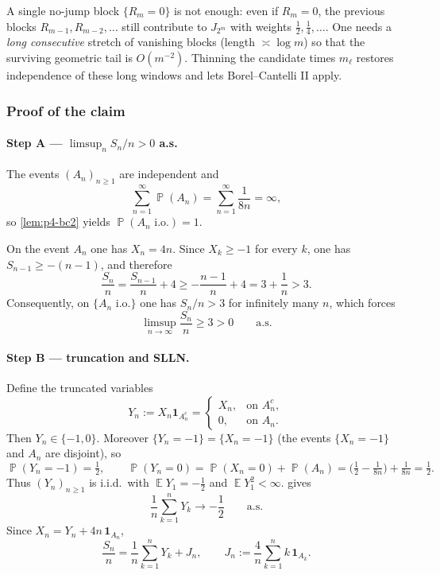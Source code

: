 \documentclass[11pt,a4paper]{article}
\DeclareMathOperator{\E}{\mathbb{E}}
\DeclareMathOperator{\Pbb}{\mathbb{P}}
\begin{document}
\begin{remark*}
A single no-jump block \(\{R_m=0\}\) is not enough: even if \(R_m=0\), the previous blocks \(R_{m-1},R_{m-2},\dots\) still contribute to \(J_{2^m}\) with weights \(\tfrac12,\tfrac14,\dots\). One needs a \emph{long consecutive} stretch of vanishing blocks (length \(\asymp\log m\)) so that the surviving geometric tail is \(O(m^{-2})\). Thinning the candidate times \(m_\ell\) restores independence of these long windows and lets Borel--Cantelli II apply.
\end{remark*}

\subsubsection{Proof of the claim}

\paragraph{Step A --- \(\limsup_n S_n/n>0\) a.s.}
The events \((A_n)_{n\ge 1}\) are independent and
\[
\sum_{n=1}^\infty\Pbb(A_n)
=
\sum_{n=1}^\infty\frac{1}{8n}
=
\infty,
\]
so \cref{lem:p4-bc2} yields \(\Pbb(A_n\text{ i.o.})=1\).

On the event \(A_n\) one has \(X_n=4n\). Since \(X_k\ge -1\) for every \(k\), one has \(S_{n-1}\ge-(n-1)\), and therefore
\[
\frac{S_n}{n}
=
\frac{S_{n-1}}{n}+4
\ge
-\frac{n-1}{n}+4
=
3+\frac{1}{n}
>
3.
\]
Consequently, on \(\{A_n\text{ i.o.}\}\) one has \(S_n/n>3\) for infinitely many \(n\), which forces
\[
\limsup_{n\to\infty}\frac{S_n}{n}
\ge 3
>
0
\qquad\text{a.s.}
\]

\paragraph{Step B --- truncation and SLLN.}
Define the truncated variables
\[
Y_n
:=
X_n\mathbf{1}_{A_n^c}
=
\begin{cases}
X_n,&\text{on }A_n^c,\\
0,&\text{on }A_n.
\end{cases}
\]
Then \(Y_n\in\{-1,0\}\). Moreover \(\{Y_n=-1\}=\{X_n=-1\}\) (the events \(\{X_n=-1\}\) and \(A_n\) are disjoint), so
\[
\Pbb(Y_n=-1)=\tfrac12,
\qquad
\Pbb(Y_n=0)
=
\Pbb(X_n=0)+\Pbb(A_n)
=
\bigl(\tfrac12-\tfrac1{8n}\bigr)+\tfrac1{8n}
=
\tfrac12.
\]
Thus \((Y_n)_{n\ge 1}\) is i.i.d.\ with \(\E Y_1=-\tfrac12\) and \(\E Y_1^2<\infty\).  gives
\[
\frac{1}{n}\sum_{k=1}^n Y_k\to-\frac12
\qquad\text{a.s.}
\]
Since \(X_n=Y_n+4n\,\mathbf{1}_{A_n}\),
\[
\frac{S_n}{n}
=
\frac{1}{n}\sum_{k=1}^n Y_k
+
J_n,
\qquad
J_n
:=
\frac{4}{n}\sum_{k=1}^n k\,\mathbf{1}_{A_k}.
\]
\end{document}
